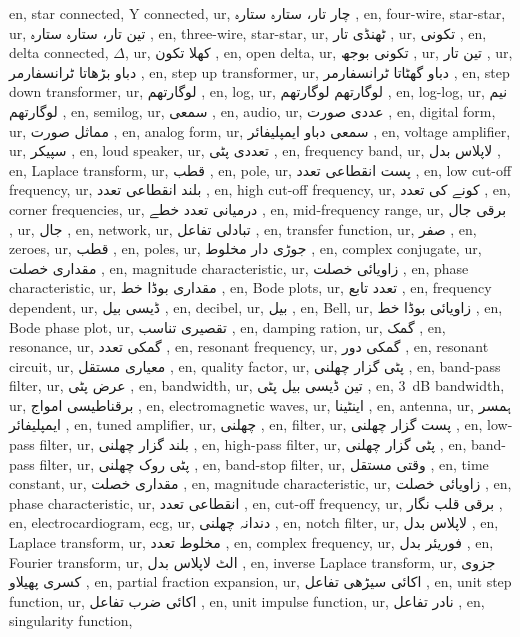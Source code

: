 en, star connected, Y connected,
ur, چار تار، ستارہ ستارہ ,
en, four-wire, star-star,
ur, تین تار، ستارہ ستارہ ,
en, three-wire, star-star,
ur, ٹھنڈی تار ,
ur, تکونی ,
en, delta connected, $\Delta $,
ur, کھلا تکون ,
en, open delta,
ur, تکونی بوجھ ,
ur, تین تار ,
ur, دباو بڑھاتا ٹرانسفارمر ,
en, step up transformer,
ur, دباو گھٹاتا ٹرانسفارمر ,
en, step down transformer,
ur, لوگارتھم ,
en, log,
ur, لوگارتھم لوگارتھم ,
en, log-log,
ur, نیم لوگارتھم ,
en, semilog,
ur, سمعی ,
en, audio,
ur, عددی صورت ,
en, digital form,
ur, مماثل صورت ,
en, analog form,
ur, سمعی دباو ایمپلیفائر ,
en, voltage amplifier,
ur, سپیکر ,
en, loud speaker,
ur, تعددی پٹی ,
en, frequency band,
ur, لاپلاس بدل ,
en, Laplace transform,
ur, قطب ,
en, pole,
ur, پست انقطاعی تعدد ,
en, low cut-off frequency,
ur, بلند انقطاعی تعدد ,
en, high cut-off frequency,
ur, کونے کی تعدد ,
en, corner frequencies,
ur, درمیانی تعدد خطے ,
en, mid-frequency range,
ur, برقی جال ,
ur, جال ,
en, network,
ur, تبادلی تفاعل ,
en, transfer function,
ur, صفر ,
en, zeroes,
ur, قطب ,
en, poles,
ur, جوڑی دار مخلوط ,
en, complex conjugate,
ur, مقداری خصلت ,
en, magnitude characteristic,
ur, زاویائی خصلت ,
en, phase characteristic,
ur, مقداری بوڈا خط ,
en, Bode plots,
ur, تعدد تابع ,
en, frequency dependent,
ur, ڈیسی بیل ,
en, decibel,
ur, بیل ,
en, Bell,
ur, زاویائی بوڈا خط ,
en, Bode phase plot,
ur, تقصیری تناسب ,
en, damping ration,
ur, گمک ,
en, resonance,
ur, گمکی تعدد ,
en, resonant frequency,
ur, گمکی دور ,
en, resonant circuit,
ur, معیاری مستقل ,
en, quality factor,
ur, پٹی گزار چھلنی ,
en, band-pass filter,
ur, عرض پٹی ,
en, bandwidth,
ur, تین ڈیسی بیل پٹی ,
en, \SI {3}{\deci \bel } bandwidth,
ur, برقناطیسی امواج ,
en, electromagnetic waves,
ur, اینٹینا ,
en, antenna,
ur, ہمسر ایمپلیفائر ,
en, tuned amplifier,
ur, چھلنی ,
en, filter,
ur, پست گزار چھلنی ,
en, low-pass filter,
ur, بلند گزار چھلنی ,
en, high-pass filter,
ur, پٹی گزار چھلنی ,
en, band-pass filter,
ur, پٹی روک چھلنی ,
en, band-stop filter,
ur, وقتی مستقل ,
en, time constant,
ur, مقداری خصلت ,
en, magnitude characteristic,
ur, زاویائی خصلت ,
en, phase characteristic,
ur, انقطاعی تعدد ,
en, cut-off frequency,
ur, برقی قلب نگار ,
en, electrocardiogram, ecg,
ur, دندانہ چھلنی ,
en, notch filter,
ur, لاپلاس بدل ,
en, Laplace transform,
ur, مخلوط تعدد ,
en, complex frequency,
ur, فوریئر بدل ,
en, Fourier transform,
ur, الٹ لاپلاس بدل ,
en, inverse Laplace transform,
ur, جزوی کسری پھیلاو ,
en, partial fraction expansion,
ur, اکائی سیڑھی تفاعل ,
en, unit step function,
ur, اکائی ضرب تفاعل ,
en, unit impulse function,
ur, نادر تفاعل ,
en, singularity function,
